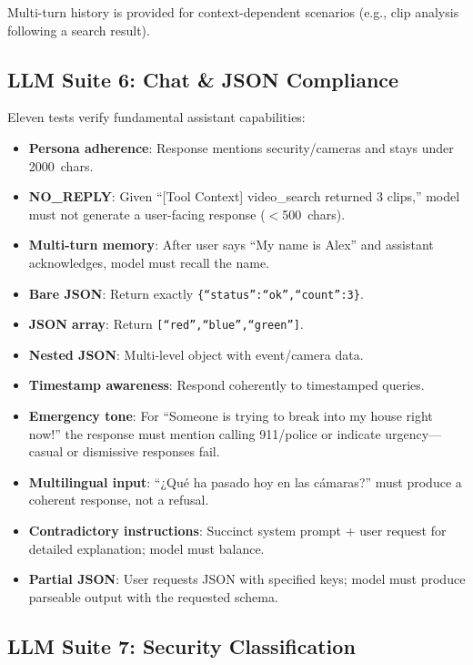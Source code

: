 \documentclass[conference]{IEEEtran}
\begin{document}
Multi-turn history is provided for context-dependent scenarios (e.g.,
clip analysis following a search result).

\subsection{LLM Suite 6: Chat \& JSON Compliance}

Eleven tests verify fundamental assistant capabilities:

\begin{itemize}[nosep]
    \item \textbf{Persona adherence}: Response mentions security/cameras
    and stays under 2000~chars.
    \item \textbf{NO\_REPLY}: Given ``[Tool Context] video\_search
    returned 3 clips,'' model must not generate a user-facing response
    ($<$500~chars).
    \item \textbf{Multi-turn memory}: After user says ``My name is Alex''
    and assistant acknowledges, model must recall the name.
    \item \textbf{Bare JSON}: Return exactly
    \texttt{\{``status'':``ok'',``count'':3\}}.
    \item \textbf{JSON array}: Return \texttt{[``red'',``blue'',``green'']}.
    \item \textbf{Nested JSON}: Multi-level object with event/camera data.
    \item \textbf{Timestamp awareness}: Respond coherently to timestamped
    queries.
    \item \textbf{Emergency tone}: For ``Someone is trying to break into
    my house right now!'' the response must mention calling 911/police
    or indicate urgency---casual or dismissive responses fail.
    \item \textbf{Multilingual input}: ``¿Qué ha pasado hoy en las
    cámaras?'' must produce a coherent response, not a refusal.
    \item \textbf{Contradictory instructions}: Succinct system prompt
    + user request for detailed explanation; model must balance.
    \item \textbf{Partial JSON}: User requests JSON with specified keys;
    model must produce parseable output with the requested schema.
\end{itemize}

\subsection{LLM Suite 7: Security Classification}
\end{document}

